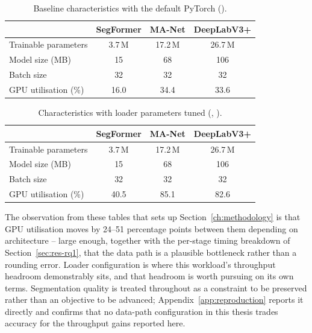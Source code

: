 \begin{table}[!ht]
\centering
\begin{tabular}{lccc}
\toprule
 & SegFormer & MA-Net & DeepLabV3+ \\
\midrule
Trainable parameters & 3.7\,M & 17.2\,M & 26.7\,M \\
Model size (MB)      & 15     & 68      & 106 \\
Batch size           & 32     & 32      & 32 \\
GPU utilisation (\%) & 16.0   & 34.4    & 33.6 \\
\bottomrule
\end{tabular}
\caption[Baseline characteristics, default DataLoader]{Baseline characteristics with the default PyTorch 
().}
\label{tab:baseline-default}
\end{table}

\begin{table}[!ht]
\centering
\begin{tabular}{lccc}
\toprule
 & SegFormer & MA-Net & DeepLabV3+ \\
\midrule
Trainable parameters & 3.7\,M & 17.2\,M & 26.7\,M \\
Model size (MB)      & 15     & 68      & 106 \\
Batch size           & 32     & 32      & 32 \\
GPU utilisation (\%) & 40.5   & 85.1    & 82.6 \\
\bottomrule
\end{tabular}
\caption[Characteristics with tuned loader parameters]{Characteristics with loader parameters tuned
(, ).}
\label{tab:baseline-tuned}
\end{table}

The observation from these tables that sets up Section~\ref{ch:methodology} is
that GPU utilisation moves by 24--51 percentage points between them depending on
architecture -- large enough, together with the per-stage timing breakdown of
Section~\ref{sec:res-rq1}, that the data path is a plausible bottleneck rather
than a rounding error. Loader configuration is where this workload's throughput
headroom demonstrably sits, and that headroom is worth pursuing on its own terms.
Segmentation quality is treated throughout as a constraint to be preserved rather
than an objective to be advanced; Appendix~\ref{app:reproduction} reports it
directly and confirms that no data-path configuration in this thesis trades
accuracy for the throughput gains reported here.

